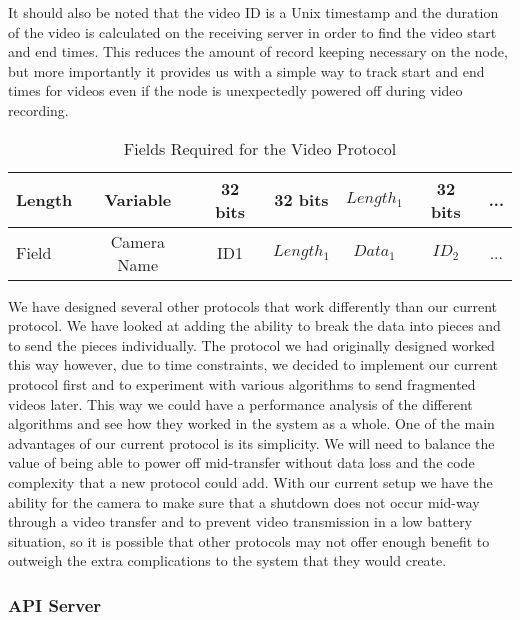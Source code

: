 It should also be noted that the video ID is a Unix timestamp and the duration
of the video is calculated on the receiving server in order to find the video
start and end times.  This reduces the amount of record keeping necessary on the
node, but more importantly it provides us with a simple way to track start and
end times for videos even if the node is unexpectedly powered off during video
recording.

\begin{table}[!t]
\renewcommand{\arraystretch}{1.3}
\caption{Fields Required for the Video Protocol}
\label{video_protocol}
\centering

\begin{tabular}{ | l || c | c | c | c | c | c |}
    \hline  
    Length & Variable & 32 bits & 32 bits & $Length_1$ & 32 bits & ...\\
    \hline                       
    Field & Camera Name & ID{1} & $Length_1$ & $Data_1$ & $ID_2$ & ...\\
    \hline  
\end{tabular}

\end{table}


We have designed several other protocols that work differently than our current
protocol. We have looked at adding the ability to break the data into pieces and
to send the pieces individually. The protocol we had originally designed worked
this way however, due to time constraints, we decided to implement our current
protocol first and to experiment with various algorithms to send fragmented
videos later. This way we could have a performance analysis of the different
algorithms and see how they worked in the system as a whole. One of the main
advantages of our current protocol is its simplicity. We will need to balance
the value of being able to power off mid-transfer without data loss and the code
complexity that a new protocol could add. With our current setup we have the
ability for the camera to make sure that a shutdown does not occur mid-way
through a video transfer and to prevent video transmission in a low battery
situation, so it is possible that other protocols may not offer enough benefit
to outweigh the extra complications to the system that they would create.

\subsubsection{API Server}

